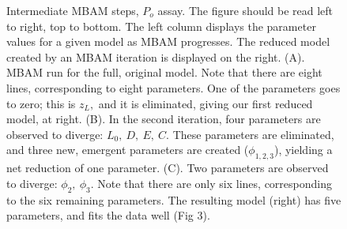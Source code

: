 \documentclass{article}
\newcommand\po{P_o}
\begin{document}
\begin{figure}
\begin{subfigure}[b]{0.48\linewidth}
{
}

\end{subfigure}


\caption{Intermediate MBAM steps, $\po$ assay.  The figure should be read left to right, top to bottom.  The left column displays the parameter values for a given model as MBAM progresses.  The reduced model created by an MBAM iteration is displayed on the right.  (A). MBAM run for the full, original model.  Note that there are eight lines, corresponding to eight parameters.  One of the parameters goes to zero; this is $z_L,$ and it is eliminated, giving our first reduced model, at right.  (B). In the second iteration, four parameters are observed to diverge: $L_0, \ D, \ E,\ C.$  These parameters are eliminated, and three new, emergent parameters are created ($\phi_{1,2,3}$), yielding a net reduction of one parameter.  (C). Two parameters are observed to diverge: $\phi_2, \ \phi_3$.  Note that there are only six lines, corresponding to the six remaining parameters.  The resulting model (right) has five parameters, and fits the data well (Fig 3).}




\end{figure}
\end{document}

